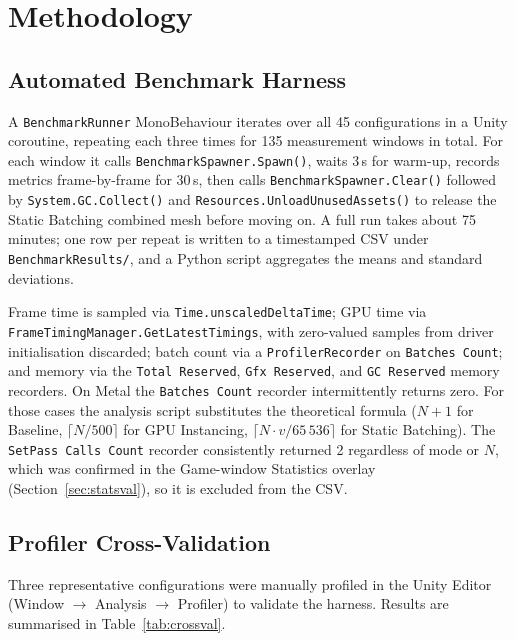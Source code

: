 \documentclass[11pt,a4paper]{article}
\begin{document}
\section{Methodology}
\label{sec:methodology}

\subsection{Automated Benchmark Harness}

A \texttt{BenchmarkRunner} MonoBehaviour iterates over all 45 configurations in a Unity
coroutine, repeating each three times for 135 measurement windows in total. For each
window it calls \texttt{BenchmarkSpawner.Spawn()}, waits 3\,s for warm-up, records
metrics frame-by-frame for 30\,s, then calls \texttt{BenchmarkSpawner.Clear()} followed
by \texttt{System.GC.Collect()} and \texttt{Resources.\allowbreak UnloadUnusedAssets()} to release
the Static Batching combined mesh before moving on. A full run takes about 75 minutes;
one row per repeat is written to a timestamped CSV under \texttt{BenchmarkResults/}, and
a Python script aggregates the means and standard deviations.

Frame time is sampled via \texttt{Time.unscaledDeltaTime}; GPU time via
\texttt{FrameTimingManager.\allowbreak GetLatestTimings}, with zero-valued samples from driver
initialisation discarded; batch count via a \texttt{ProfilerRecorder} on
\texttt{Batches Count}; and memory via the \texttt{Total Reserved},
\texttt{Gfx Reserved}, and \texttt{GC Reserved} memory recorders. On Metal the
\texttt{Batches Count} recorder intermittently returns zero. For those cases the
analysis script substitutes the theoretical formula ($N{+}1$ for Baseline,
$\lceil N/500 \rceil$ for GPU Instancing, $\lceil N \cdot v / 65\,536 \rceil$ for
Static Batching). The \texttt{SetPass Calls Count} recorder consistently returned 2
regardless of mode or $N$, which was confirmed in the Game-window Statistics overlay
(Section~\ref{sec:statsval}), so it is excluded from the CSV.

\subsection{Profiler Cross-Validation}
\label{sec:crossvalidation}

Three representative configurations were manually profiled in the Unity Editor
(Window $\to$ Analysis $\to$ Profiler) to validate the harness.
Results are summarised in Table~\ref{tab:crossval}.
\end{document}
